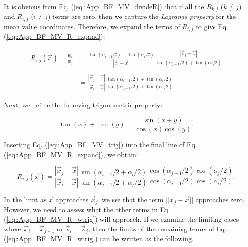 \noindent It is obvious from Eq. (\ref{eq::App_BF_MV_divideR}) that if all the $R_{k,j}$ ($k \neq j$) and $R_{i,j}$ ($i \neq j$) terms are zero, then we capture the {\em Lagrange property} for the mean value coordinates. Therefore, we expand the terms of $R_{i,j}$ to give Eq. (\ref{eq::App_BF_MV_R_expand}).

\begin{equation}
\label{eq::App_BF_MV_R_expand}
\begin{aligned}
R_{i,j}(\vec{x}) = \frac{w_i}{w_j}  &= \frac{\tan (\alpha_{i-1}/2) + \tan (\alpha_{i}/2)}{| \vec{x}_i - \vec{x} |} \frac{| \vec{x}_j - \vec{x} |}{\tan (\alpha_{j-1}/2) + \tan (\alpha_{j}/2)} \\ \\
&= \frac{| \vec{x}_j - \vec{x} |}{| \vec{x}_i - \vec{x}|} \frac{\tan (\alpha_{i-1}/2) + \tan (\alpha_{i}/2)}{\tan (\alpha_{j-1}/2) + \tan (\alpha_{j}/2)}
\end{aligned}
\end{equation}

\noindent Next, we define the following trigonometric property:

\begin{equation}
\label{eq::App_BF_MV_trig}
\tan(x) + \tan(y) = \frac{\sin(x+y)}{\cos(x) \cos(y)} .
\end{equation} 

\noindent Inserting Eq. (\ref{eq::App_BF_MV_trig}) into the final line of Eq. (\ref{eq::App_BF_MV_R_expand}), we obtain:

\begin{equation}
\label{eq::App_BF_MV_R_wtrig}
R_{i,j}(\vec{x}) = \frac{| \vec{x}_j - \vec{x} |}{| \vec{x}_i - \vec{x} |} \frac{\sin (\alpha_{i-1}/2 + \alpha_{i}/2)}{\sin (\alpha_{j-1}/2 + \alpha_{j}/2)} \frac{\cos (\alpha_{j-1}/2) \cos (\alpha_{j}/2)}{\cos (\alpha_{i-1}/2) \cos (\alpha_{i}/2)} .
\end{equation} 

\noindent In the limit as $\vec{x}$ approaches $\vec{x}_j$, we see that the term $|| \vec{x}_j - \vec{x} ||$ approaches zero. However, we need to assess what the other terms in Eq. (\ref{eq::App_BF_MV_R_wtrig}) will approach. If we examine the limiting cases where $\vec{x}_i = \vec{x}_{j-1}$ or $\vec{x}_i = \vec{x}_{j}$, then the limits of the remaining terms of Eq. (\ref{eq::App_BF_MV_R_wtrig}) can be written as the following.

